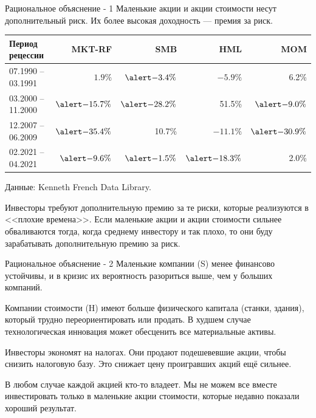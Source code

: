 \documentclass{beamer}
\begin{document}
\begin{frame}{Рациональное объяснение - 1}
\justify
Маленькие акции и акции стоимости несут дополнительный риск. Их более высокая
доходность --- премия за риск.

\justify
\centering
\begin{tabular}{l|r|r|r|r}
Период рецессии    & MKT-RF  & SMB & HML & MOM \\ \hline
07.1990 -- 03.1991 & $1.9\%$ & $\alert{-3.4\%}$ & \alert{$-5.9\%$} & 6.2\% \\
03.2000 -- 11.2000 & $\alert{-15.7\%}$ & $\alert{-28.2\%}$ & 51.5\% & $\alert{-9.0\%}$ \\
12.2007 -- 06.2009 & $\alert{-35.4\%}$ & 10.7\% & \alert{$-11.1\%$} & $\alert{-30.9\%}$ \\
02.2021 -- 04.2021 & $\alert{-9.6\%}$ & $\alert{-1.5\%}$ & $\alert{-18.3\%}$ & 2.0\%
\end{tabular}
\centering
{\scriptsize Данные: Kenneth French Data Library.}

\justify
Инвесторы требуют дополнительную премию за те риски, которые реализуются в
<<плохие времена>>. Если маленькие акции и акции стоимости сильнее обваливаются 
тогда, когда среднему инвестору и так плохо, то они буду зарабатывать
дополнительную премию за риск.
\end{frame}



\begin{frame}{Рациональное объяснение - 2}
\justify
Маленькие компании (S) менее финансово устойчивы, и в кризис их вероятность
разориться выше, чем у больших компаний.

\justify
Компании стоимости (H) имеют больше физического капитала (станки, здания), 
который трудно переориентировать или продать. В худшем случае технологическая 
инновация может обесценить все материальные активы.

\justify
Инвесторы экономят на налогах. Они продают подешевевшие акции, чтобы снизить 
налоговую базу. Это снижает цену проигравших акций ещё сильнее.

\justify
В любом случае каждой акцией кто-то владеет. Мы не можем все вместе 
инвестировать только в маленькие акции стоимости, которые недавно показали
хороший результат.
\end{frame}
\end{document}
